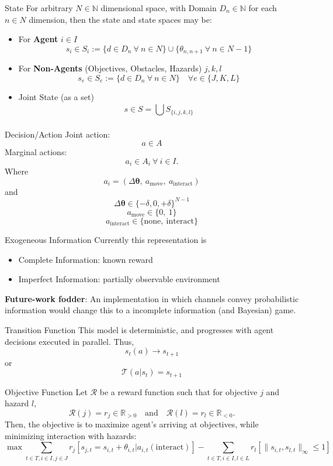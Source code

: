 \begin{frame}{State}
    For arbitrary \(N\in\mathbb{N}\) dimensional space, with Domain \(D_n\in\mathbb{N}\) 
    for each \(n\in N\) dimension, then the state and state spaces may be:
    \begin{itemize}
        \item For \textbf{Agent} \(i\in I\)
            \[s_i \in S_i := \{d\in D_n\ \forall\ n\in N\}\cup\{\theta_{n,n+1}\ \forall\ n\in N-1\}\]
        \item For \textbf{Non-Agents} (Objectives, Obstacles, Hazards) \(j,k,l\)
            \[s_e \in S_{e} := \{d\in D_n\ \forall\ n\in N\} \quad\forall e \in \{J,K,L\}\]
        \item Joint State (as a set)
            \[s \in S = \bigcup_{}^{} S_{\{i,j,k,l\}}\]
    \end{itemize}
\end{frame}

\begin{frame}{Decision/Action}
    Joint action:
    \[a \in A\]
    Marginal actions:
    \[a_i \in A_i \ \forall\ i\in I.\]
    Where
    \[a_i = (\Delta\boldsymbol{\theta},\ a_{\text{move}},\ a_{\text{interact}})\]
    and
    \[\Delta\boldsymbol{\theta} \in \{-\delta, 0, +\delta\}^{N-1}\]
    \[a_{\text{move}} \in \{0,\ 1\}\]
    \[a_{\text{interact}} \in \{\text{none},\ \text{interact}\}\]
\end{frame}

\begin{frame}{Exogeneous Information}
    Currently this representation is
    \begin{itemize}
        \item Complete Information: known reward
        \item Imperfect Information: partially observable environment
    \end{itemize} 
    \textbf{Future-work fodder}: An implementation in which channels convey probabilistic 
    information would change this to a incomplete information (and Bayesian) game.
\end{frame}

\begin{frame}{Transition Function}
    This model is deterministic, and progresses with agent decisions executed in parallel. 
    Thus,
        \[s_{t}(a) \rightarrow s_{t+1}\]
    or
        \[\mathcal{T}(a|s_{t}) = s_{t+1}\]
\end{frame}

\begin{frame}{Objective Function}
    Let \(\mathcal{R}\) be a reward function such that for objective \(j\)
    and hazard \(l\),
    \[
        \mathcal{R}(j) = r_{j} \in \mathbb{R}_{>0}
        \quad \text{and} \quad
        \mathcal{R}(l) = r_{l} \in \mathbb{R}_{<0}.
    \]
    Then, the objective is to maximize agent's arriving at objectives, 
    while minimizing interaction with hazards:
    \[
        \max \sum_{t\in T,i\in I, j\in J} r_{j}[s_{j,t} = s_{i,t} 
            + \theta_{i,t} | a_{i,t}(\text{interact}) ]
        - \sum_{t\in T,i\in I, l\in L} r_{l}[\|s_{i,t},s_{l,t}\|_\infty \leq 1]
    \]
\end{frame}

